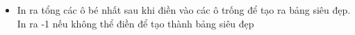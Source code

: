 \begin{itemize}
	\item In ra tổng các ô bé nhất sau khi điền vào các ô trống để tạo ra bảng siêu đẹp. In ra -1 nếu không thể điền để tạo thành bảng siêu đẹp
\end{itemize}